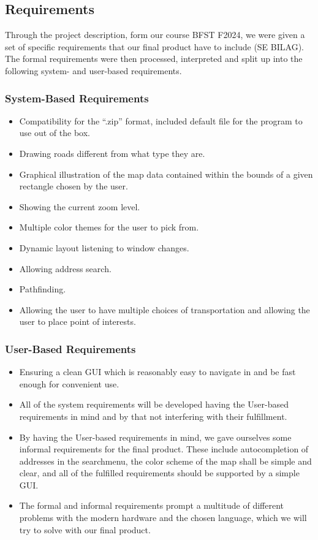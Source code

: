 \subsection{Requirements}
Through the project description, form our course BFST F2024, we were given a set of specific requirements that our final product have to include (SE BILAG).
The formal requirements were then processed, interpreted and split up into the following system- and user-based requirements.
\subsubsection{System-Based Requirements}
\begin{itemize}
\setlength{\itemsep}{0.2em}
    \item Compatibility for the “.zip” format, included default file for the program to use out of the box.
    \item Drawing roads different from what type they are.
    \item Graphical illustration of the map data contained within the bounds of a given rectangle chosen by the user.
    \item Showing the current zoom level.
    \item Multiple color themes for the user to pick from.
    \item Dynamic layout listening to window changes.
    \item Allowing address search.
    \item Pathfinding.
    \item Allowing the user to have multiple choices of transportation and allowing the user to place point of interests.
\end{itemize}
\subsubsection{User-Based Requirements}
\begin{itemize}
    \setlength{\itemsep}{0.2em}
    \item Ensuring a clean GUI which is reasonably easy to navigate in and be fast enough for convenient use. 
    \item All of the system requirements will be developed having the User-based requirements in mind and by that not interfering with their fulfillment.
    \item By having the User-based requirements in mind, we gave ourselves some informal requirements for the final product. These include autocompletion of addresses in the searchmenu, the color scheme of the map shall be simple and clear, and all of the fulfilled requirements should be supported by a simple GUI.
    \item The formal and informal requirements prompt a multitude of different problems with the modern hardware and the chosen language, which we will try to solve with our final product.
\end{itemize}

